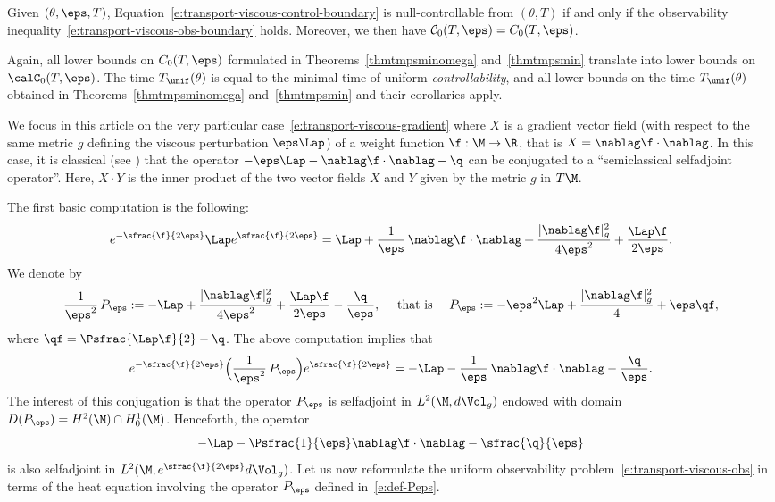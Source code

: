 \begin{corollary}[Observability constant = control cost]
Given $(\theta, \eps, T)$, Equation~\eqref{e:transport-viscous-control-boundary} is null-controllable from $(\theta, T)$ if and only if the observability inequality~\eqref{e:transport-viscous-obs-boundary} holds.
Moreover, we then have $\mathcal{C}_0(T,\eps)= C_0(T,\eps)$.
\end{corollary}
Again, all lower bounds on $C_0(T,\eps)$ formulated in Theorems~\ref{thmtmpsminomega} and~\ref{thmtmpsmin} translate into lower bounds on $\calC_0(T,\eps)$. The time $T_{\unif}(\theta)$ is equal to the minimal time of uniform {\em controllability}, and all lower bounds on the time $T_{\unif}(\theta)$ obtained in Theorems~\ref{thmtmpsminomega} and~\ref{thmtmpsmin} and their corollaries apply.

\label{sectconjug}

We focus in this article on the very particular case~\eqref{e:transport-viscous-gradient} where $X$ is a gradient vector field (with respect to the same metric $g$ defining the viscous perturbation $\eps \Lap$) of a weight function $\f : \M\to \R$, that is $X = \nablag \f \cdot \nablag$. In this case, it is classical (see \eg \cite{Witten:82,HS:85}) that the operator $-\eps \Lap - \nablag \f \cdot \nablag-\q$ can be conjugated to a ``semiclassical selfadjoint operator''. Here, $X\cdot Y$ is the inner product of the two vector fields $X$ and $Y$ given by the metric $g$ in $T\M$.

The first basic computation is the following:
\[
e^{-\sfrac{\f}{2\eps}} \Lap e^{\sfrac{\f}{2\eps}} = \Lap + \frac{1}{\eps}\,\nablag \f \cdot \nablag + \frac{|\nablag \f|_g^2}{4\eps^2} + \frac{\Lap \f}{2\eps}.
\]
We denote by
\begin{equation}
\label{e:def-Peps}
\frac{1}{\eps^2}\,P_\eps := - \Lap + \frac{|\nablag \f|_g^2}{4\eps^2} + \frac{\Lap \f}{2\eps}-\frac{ \q}{\eps}, \quad \text{ that is } \quad P_\eps := - \eps^2 \Lap + \frac{|\nablag \f|_g^2}{4} + \eps \qf,
\end{equation}
where $\qf= \Psfrac{\Lap \f}{2}-\q$. The above computation implies that
\begin{equation}
\label{e:trans-eps}
e^{-\sfrac{\f}{2\eps}} \Bigl( \frac{1}{\eps^2}\,P_\eps \Bigr)e^{\sfrac{\f}{2\eps}} = - \Lap - \frac{1}{\eps}\,\nablag \f \cdot \nablag-\frac{\q}{\eps}.
\end{equation}
The interest of this conjugation is that the operator $P_\eps$ is selfadjoint in $L^2(\M,d\Vol_g)$ endowed with domain $D(P_\eps) = H^2(\M)\cap H^1_0(\M)$. Henceforth, the operator
\[
- \Lap - \Psfrac{1}{\eps}\nablag \f \cdot \nablag-\sfrac{\q}{\eps}
\]
is also selfadjoint in $L^2(\M, e^{\sfrac{\f}{2\eps}} d\Vol_g)$.
Let us now reformulate the uniform observability problem~\eqref{e:transport-viscous-obs} in terms of the heat equation involving the operator $P_\eps$ defined in~\eqref{e:def-Peps}.

